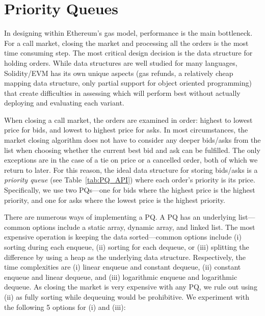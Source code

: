 
\section{Priority Queues}\label{sec:pq}



In designing \cm within Ethereum's gas model, performance is the main bottleneck. For a call market, closing the market and processing all the orders is the most time consuming step. The most critical design decision is the data structure for holding orders. While data structures are well studied for many languages, Solidity/EVM has its own unique aspects (\eg gas refunds, a relatively cheap mapping data structure, only partial support for object oriented programming) that create difficulties in assessing which will perform best without actually deploying and evaluating each variant. 

When closing a call market, the orders are examined in order: highest to lowest price for bids, and lowest to highest price for asks. In most circumstances, the market closing algorithm does not have to consider any deeper bids/asks from the list when choosing whether the current best bid and ask can be fulfilled. The only exceptions are in the case of a tie on price or a cancelled order, both of which we return to later. For this reason, the ideal data structure for storing bids/asks is a \textit{priority queue} (see Table~\ref{tab:PQ_API}) where each order's priority is its price. Specifically, we use two PQs---one for bids where the highest price is the highest priority, and one for asks where the lowest price is the highest priority. 

There are numerous ways of implementing a PQ. A PQ has an underlying list---common options include a static array, dynamic array, and linked list. The most expensive operation is keeping the data sorted---common options include (i) sorting during each enqueue, (ii) sorting for each dequeue, or (iii) splitting the difference by using a heap as the underlying data structure. Respectively, the time complexities are (i) linear enqueue and constant dequeue, (ii) constant enqueue and linear dequeue, and (iii) logarithmic enqueue and logarithmic dequeue. As closing the market is very expensive with any PQ, we rule out using (ii) as fully sorting while dequeuing would be prohibitive. We experiment with the following 5 options for (i) and (iii):

